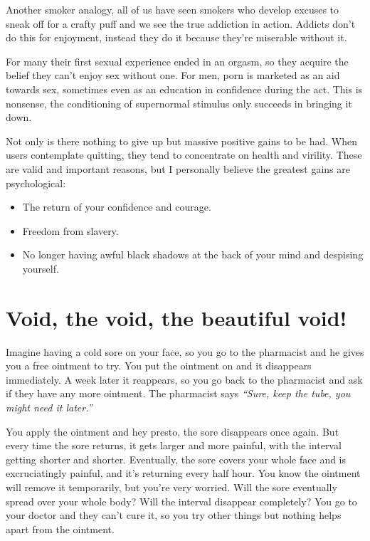 \documentclass[
]{book}
\begin{document}
Another smoker analogy, all of us have seen smokers who develop excuses to sneak off for a crafty puff and we see the true addiction in action. Addicts don't do this for enjoyment, instead they do it because they're miserable without it.

For many their first sexual experience ended in an orgasm, so they acquire the belief they can't enjoy sex without one. For men, porn is marketed as an aid towards sex, sometimes even as an education in confidence during the act. This is nonsense, the conditioning of supernormal stimulus only succeeds in bringing it down.

Not only is there nothing to give up but massive positive gains to be had. When users contemplate quitting, they tend to concentrate on health and virility. These are valid and important reasons, but I personally believe the greatest gains are psychological:

\begin{itemize}
\item
  The return of your confidence and courage.
\item
  Freedom from slavery.
\item
  No longer having awful black shadows at the back of your mind and despising yourself.
\end{itemize}

\hypertarget{void-the-void-the-beautiful-void}{%
\section{Void, the void, the beautiful void!}\label{void-the-void-the-beautiful-void}}

Imagine having a cold sore on your face, so you go to the pharmacist and he gives you a free ointment to try. You put the ointment on and it disappears immediately. A week later it reappears, so you go back to the pharmacist and ask if they have any more ointment. The pharmacist says \emph{``Sure, keep the tube, you might need it later.''}

You apply the ointment and hey presto, the sore disappears once again. But every time the sore returns, it gets larger and more painful, with the interval getting shorter and shorter. Eventually, the sore covers your whole face and is excruciatingly painful, and it's returning every half hour. You know the ointment will remove it temporarily, but you're very worried. Will the sore eventually spread over your whole body? Will the interval disappear completely? You go to your doctor and they can't cure it, so you try other things but nothing helps apart from the ointment.
\end{document}
